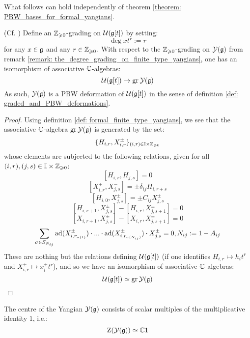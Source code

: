         What follows can hold independently of theorem \ref{theorem: PBW_bases_for_formal_yangians}. 
        \begin{lemma} \label{lemma: finite_type_yangians_as_PBW_deformations}
            (Cf. \cite[Proposition 12.1.6]{chari_pressley_quantum_groups}) Define an $\mathbb{Z}_{\geqslant 0}$-grading on $\mathcal{U}(\mathfrak{g}[t])$ by setting:
                $$\deg x t^r := r$$
            for any $x \in \mathfrak{g}$ and any $r \in \mathbb{Z}_{\geqslant 0}$. With respect to the $\mathbb{Z}_{\geqslant 0}$-grading on $\mathcal{Y}(\mathfrak{g})$ from remark \ref{remark: the_degree_grading_on_finite_type_yangians}, one has an isomorphism of associative $\mathbb{C}$-algebras:
                $$\mathcal{U}( \mathfrak{g}[t] ) \to \operatorname{gr} \mathcal{Y}(\mathfrak{g})$$
            As such, $\mathcal{Y}(\mathfrak{g})$ is a PBW deformation of $\mathcal{U}(\mathfrak{g}[t])$ in the sense of definition \ref{def: graded_and_PBW_deformations}.
        \end{lemma}
            \begin{proof}
                Using definition \ref{def: formal_finite_type_yangians}, we see that the associative $\mathbb{C}$-algebra $\operatorname{gr} \mathcal{Y}(\mathfrak{g})$ is generated by the set:
                    $$\{ H_{i, r}, X_{i, r}^{\pm} \}_{(i ,r) \in \simpleroots \x \Z_{\geq 0}}$$
                whose elements are subjected to the following relations, given for all $(i, r), (j, s) \in \simpleroots \x \Z_{\geq 0}$:
                    $$[ H_{i, r}, H_{j, s} ] = 0$$
                    $$[ X_{i, r}^+, X_{j, s}^- ] = \pm \delta_{ij} H_{i, r + s}$$
                    $$[ H_{i, 0}, X_{j, s}^{\pm} ] = \pm C_{ij} X_{j, s}^{\pm}$$
                    $$[ H_{i, r + 1}, X_{j, s}^{\pm} ] - [ H_{i, r}, X_{j, s + 1}^{\pm} ] = 0$$
                    $$[ X_{i, r + 1}, X_{j, s}^{\pm} ] - [ X_{i, r}, X_{j, s + 1}^{\pm} ] = 0$$
                    $$\sum_{\sigma \in S_{N_{ij}}} \mathrm{ad}(X_{i, r_{\sigma(1)}}^{\pm}) \cdot ... \cdot \mathrm{ad}(X_{i, r_{\sigma(N_{ij})}}^{\pm}) \cdot X_{j, s}^{\pm} = 0, N_{ij} := 1 - A_{ij}$$
                These are nothing but the relations defining $\mathcal{U}( \mathfrak{g}[t] )$ (if one identifies $H_{i, r} \mapsto h_i t^r$ and $X_{i, r}^{\pm} \mapsto x_i^{\pm} t^r$), and so we have an isomorphism of associative $\mathbb{C}$-algebras:
                    $$\mathcal{U}( \mathfrak{g}[t] ) \simeq \operatorname{gr} \mathcal{Y}(\mathfrak{g})$$ 
            \end{proof}
        \begin{corollary} \label{coro: centres_of_finite_type_yangians}
            The centre of the Yangian $\mathcal{Y}(\mathfrak{g})$ consists of scalar multiples of the multiplicative identity $1$, i.e.:
                $$\mathrm{Z}( \mathcal{Y}(\mathfrak{g}) ) \simeq \mathbb{C} 1$$
        \end{corollary}
